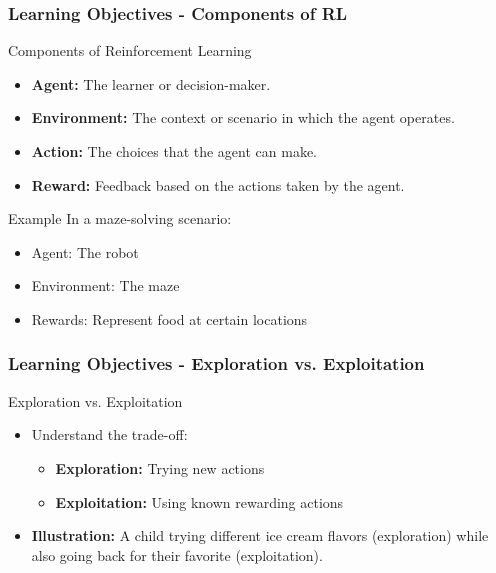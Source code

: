 \documentclass{beamer}
\begin{document}
\begin{frame}[fragile]
    \frametitle{Learning Objectives - Components of RL}
    \begin{block}{Components of Reinforcement Learning}
        \begin{itemize}
            \item \textbf{Agent:} The learner or decision-maker.
            \item \textbf{Environment:} The context or scenario in which the agent operates.
            \item \textbf{Action:} The choices that the agent can make.
            \item \textbf{Reward:} Feedback based on the actions taken by the agent.
        \end{itemize}
        \begin{block}{Example}
            In a maze-solving scenario:
            \begin{itemize}
                \item Agent: The robot
                \item Environment: The maze
                \item Rewards: Represent food at certain locations
            \end{itemize}
        \end{block}
    \end{block}
\end{frame}

\begin{frame}[fragile]
    \frametitle{Learning Objectives - Exploration vs. Exploitation}
    \begin{block}{Exploration vs. Exploitation}
        \begin{itemize}
            \item Understand the trade-off:
            \begin{itemize}
                \item \textbf{Exploration:} Trying new actions
                \item \textbf{Exploitation:} Using known rewarding actions
            \end{itemize}
            \item \textbf{Illustration:} A child trying different ice cream flavors (exploration) while also going back for their favorite (exploitation).
        \end{itemize}
    \end{block}
\end{frame}
\end{document}
